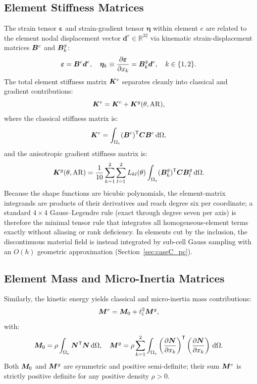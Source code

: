 \subsection{Element Stiffness Matrices}
The strain tensor $\bm\varepsilon$ and strain-gradient tensor $\bm\eta$ within element $e$ are related to the element nodal displacement vector $\bm{d}^e \in \mathbb{R}^{32}$ via kinematic strain-displacement matrices $\bm{B}^c$ and $\bm{B}^g_k$:
\begin{equation}
\bm\varepsilon = \bm{B}^c \bm{d}^e, \quad \bm\eta_k \equiv \frac{\partial \bm\varepsilon}{\partial x_k} = \bm{B}^g_k \bm{d}^e, \quad k \in \{1, 2\}.
\label{eq:strain_matrices}
\end{equation}
The total element stiffness matrix $\bm{K}^e$ separates cleanly into classical and gradient contributions:
\begin{equation}
\bm{K}^e = \bm{K}^c + \bm{K}^g(\theta, \mathrm{AR}),
\label{eq:Ke_total}
\end{equation}
where the classical stiffness matrix is:
\begin{equation}
\bm{K}^c = \int_{\Omega_e} (\bm{B}^c)^\mathsf{T} \bm{C} \bm{B}^c \,\mathrm{d}\Omega,
\label{eq:Kc_int}
\end{equation}
and the anisotropic gradient stiffness matrix is:
\begin{equation}
\bm{K}^g(\theta, \mathrm{AR}) = \frac{1}{10} \sum_{k=1}^2 \sum_{l=1}^2 L_{kl}(\theta) \int_{\Omega_e} (\bm{B}^g_k)^\mathsf{T} \bm{C} \bm{B}^g_l \,\mathrm{d}\Omega.
\label{eq:Kg_int}
\end{equation}
Because the shape functions are bicubic polynomials, the element-matrix integrands are products of their derivatives and reach degree six per coordinate; a standard $4 \times 4$ Gauss--Legendre rule (exact through degree seven per axis) is therefore the minimal tensor rule that integrates all homogeneous-element terms exactly without aliasing or rank deficiency. In elements cut by the inclusion, the discontinuous material field is instead integrated by sub-cell Gauss sampling with an $O(h)$ geometric approximation (Section~\ref{sec:caseC_pc}).

\subsection{Element Mass and Micro-Inertia Matrices}
Similarly, the kinetic energy yields classical and micro-inertia mass contributions:
\begin{equation}
\bm{M}^e = \bm{M}_0 + \ell_{\mathrm{i}}^2 \bm{M}^g,
\label{eq:Me_total}
\end{equation}
with:
\begin{equation}
\bm{M}_0 = \rho \int_{\Omega_e} \bm{N}^\mathsf{T} \bm{N} \,\mathrm{d}\Omega, \quad \bm{M}^g = \rho \sum_{k=1}^2 \int_{\Omega_e} \left(\frac{\partial \bm{N}}{\partial x_k}\right)^\mathsf{T} \left(\frac{\partial \bm{N}}{\partial x_k}\right) \,\mathrm{d}\Omega.
\label{eq:Mg_int}
\end{equation}
Both $\bm{M}_0$ and $\bm{M}^g$ are symmetric and positive semi-definite; their sum $\bm{M}^e$ is strictly positive definite for any positive density $\rho > 0$.

